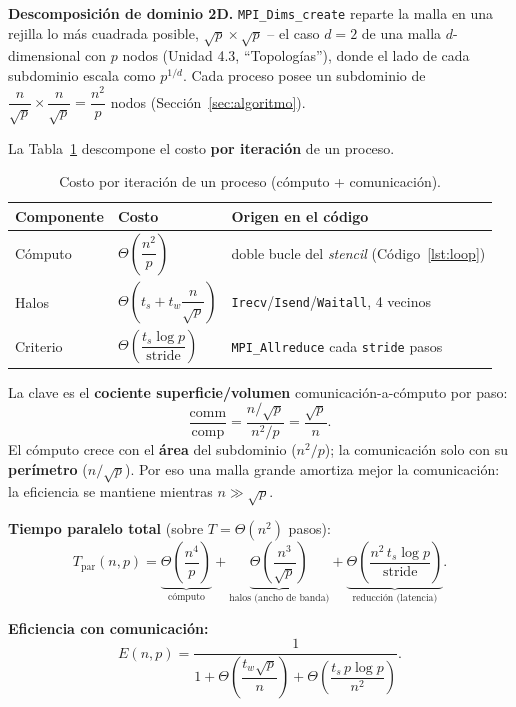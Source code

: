 \documentclass[11pt,a4paper]{article}
\begin{document}
	\textbf{Descomposición de dominio 2D.} \texttt{MPI\_Dims\_create} reparte la
	malla en una rejilla lo más cuadrada posible, $\sqrt{p}\times\sqrt{p}$ -- el
	caso $d=2$ de una malla $d$-dimensional con $p$ nodos (Unidad 4.3,
	``Topologías''), donde el lado de cada subdominio escala como $p^{1/d}$. Cada
	proceso posee un subdominio de
	$\dfrac{n}{\sqrt p}\times\dfrac{n}{\sqrt p}=\dfrac{n^2}{p}$ nodos
	(Sección~\ref{sec:algoritmo}).

	La Tabla~\ref{tab:bsp-costos} descompone el costo \textbf{por iteración} de un
	proceso.

	\begin{table}[H]
	\centering
	\begin{tabular}{lll}
		\toprule
		\textbf{Componente} & \textbf{Costo} & \textbf{Origen en el código} \\
		\midrule
		Cómputo & $\Theta\!\left(\dfrac{n^2}{p}\right)$ & doble bucle del \textit{stencil} (Código~\ref{lst:loop}) \\
		Halos & $\Theta\!\left(t_s+t_w\dfrac{n}{\sqrt p}\right)$ & \texttt{Irecv}/\texttt{Isend}/\texttt{Waitall}, 4 vecinos \\
		Criterio & $\Theta\!\left(\dfrac{t_s\log p}{\text{stride}}\right)$ & \texttt{MPI\_Allreduce} cada \texttt{stride} pasos \\
		\bottomrule
	\end{tabular}
	\caption{Costo por iteración de un proceso (cómputo + comunicación).}
	\label{tab:bsp-costos}
	\end{table}

	La clave es el \textbf{cociente superficie/volumen} comunicación-a-cómputo por
	paso:
	\[
	\frac{\text{comm}}{\text{comp}} = \frac{n/\sqrt p}{n^2/p} = \frac{\sqrt p}{n}.
	\]
	El cómputo crece con el \textbf{área} del subdominio ($n^2/p$); la comunicación
	solo con su \textbf{perímetro} ($n/\sqrt p$). Por eso una malla grande amortiza
	mejor la comunicación: la eficiencia se mantiene mientras $n\gg\sqrt p$.

	\textbf{Tiempo paralelo total} (sobre $T=\Theta(n^2)$ pasos):
	\[
	T_{\text{par}}(n,p) =
	\underbrace{\Theta\!\left(\frac{n^4}{p}\right)}_{\text{cómputo}}
	+\underbrace{\Theta\!\left(\frac{n^3}{\sqrt p}\right)}_{\text{halos (ancho de banda)}}
	+\underbrace{\Theta\!\left(\frac{n^2\,t_s\log p}{\text{stride}}\right)}_{\text{reducción (latencia)}}.
	\]

	\textbf{Eficiencia con comunicación:}
	\[
	E(n,p) = \frac{1}{1+\Theta\!\left(\dfrac{t_w\sqrt p}{n}\right)
	+\Theta\!\left(\dfrac{t_s\,p\log p}{n^2}\right)} .
	\]
	
\end{document}
